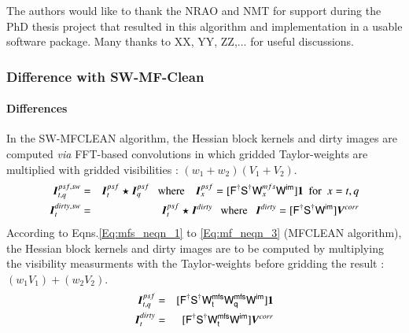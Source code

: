 \documentclass[structabstract]{stylefiles/aa}
\newcommand{\Fd}{{\tens{F^\dag}}}
\newcommand{\Sd}{{\tens{S^\dag}}}
\newcommand{\W}{{\tens{W}}}
\newcommand{\Wim}{{\tens{W^{im}}}}
\newcommand{\Wnt}{{\tens{W^{mfs}_t}}}
\newcommand{\Wnq}{{\tens{W^{mfs}_q}}}
\begin{document}

\begin{acknowledgements}
The authors would like to thank the NRAO and NMT for support during
the PhD thesis project that resulted in this algorithm and implementation
in a usable software package. Many thanks to XX, YY, ZZ,... for useful 
discussions.
\end{acknowledgements}




\begin{appendix}



\subsubsection{Difference with SW-MF-Clean}

\paragraph{Differences}
In the SW-MFCLEAN algorithm, the Hessian block kernels and dirty
images are computed {\it via} FFT-based convolutions in which 
gridded Taylor-weights
are multiplied with gridded visibilities : $(w_1+w_2)(V_1+V_2)$.
\begin{eqnarray}
\label{Eq:sw_psf}
\vec{I}^{psf,sw}_{t,q} &=& \vec{I}^{psf}_{t} \star \vec{I}^{psf}_{q} ~~~\mathrm{where}~~~~\vec{I}^{psf}_x = [\Fd\Sd\W^{mfs}_x\Wim] \vec{1} ~~\mathrm{for}~~x=t,q\\
\label{Eq:sw_dirty}
\vec{I}^{dirty,sw}_t &=& \vec{I}^{psf}_t \star \vec{I}^{dirty} ~~~\mathrm{where}~~~
\vec{I}^{dirty}=[\Fd\Sd\Wim] \vec{V}^{corr} 
\end{eqnarray}
According to Eqns.\ref{Eq:mfs_neqn_1} to \ref{Eq:mf_neqn_3} (MFCLEAN algorithm), 
the Hessian block kernels and dirty images are to be computed by 
multiplying the visibility measurments with the Taylor-weights
before gridding the result : $(w_1 V_1) + (w_2 V_2)$.
\begin{eqnarray}
\label{Eq:mfs_psf}
\vec{I}^{psf}_{t,q} &=& [\Fd\Sd\Wnt\Wnq\Wim] \vec{1}\\ 
\label{Eq:mfs_dirty}
\vec{I}^{dirty}_t &=& [\Fd\Sd\Wnt\Wim] \vec{V}^{corr}
\end{eqnarray}


\end{appendix}
\end{document}
